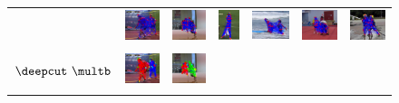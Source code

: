 \begin{figure}
  \begin{tabular}{c c c c c c c}
    \toprule
    &
    \includegraphics[height=0.140\linewidth]{imgidx_0908_init_graph_mpii_multi.pdf}&
    \includegraphics[height=0.140\linewidth]{imgidx_0104_init_graph_mpii_multi.pdf}&
    \includegraphics[height=0.140\linewidth]{imgidx_1589_init_graph_mpii_multi.pdf}&
    \includegraphics[height=0.140\linewidth]{imgidx_1183_init_graph_mpii_multi.pdf}&
    \includegraphics[height=0.140\linewidth]{imgidx_0568_init_graph_mpii_multi.pdf}&
    \includegraphics[height=0.140\linewidth]{imgidx_0804_init_graph_mpii_multi.pdf}\\
    \begin{sideways}\bf\quad $\deepcut~\multb$\end{sideways}&    
    \includegraphics[height=0.140\linewidth]{imgidx_0908_graph_mpii_multi.pdf}&
    \includegraphics[height=0.140\linewidth]{imgidx_0104_graph_mpii_multi.pdf}&

\end{tabular}
\end{figure}
